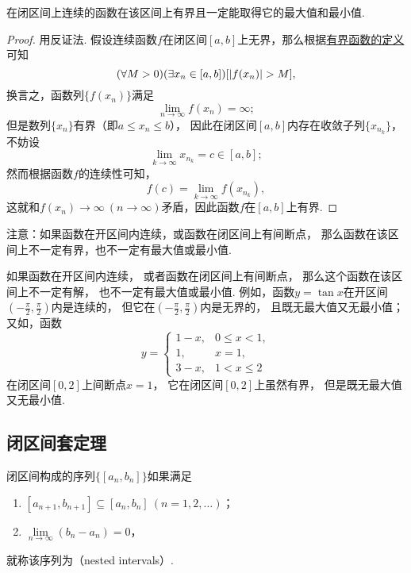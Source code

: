 \begin{theorem}[有界性与最大值最小值定理]\label{theorem:极限.闭区间上连续函数的性质.有界性与最大值最小值定理}
在闭区间上连续的函数在该区间上有界且一定能取得它的最大值和最小值.
\begin{proof}
用反证法.
假设连续函数\(f\)在闭区间\([a,b]\)上无界，那么根据\hyperref[definition:函数.函数的有界性]{有界函数的定义}可知\[
	(\forall M>0)
	(\exists x_n\in[a,b])
	[\abs{f(x_n)} > M],
\]
换言之，函数列\(\{f(x_n)\}\)满足\[
	\lim\limits_{n\to\infty} f(x_n) = \infty;
\]
但是数列\(\{x_n\}\)有界（即\(a \leq x_n \leq b\)），
因此在闭区间\([a,b]\)内存在收敛子列\(\{x_{n_k}\}\)，
不妨设\[
	\lim\limits_{k\to\infty} x_{n_k} = c \in [a,b];
\]
然而根据函数\(f\)的连续性可知，\[
	f(c) = \lim\limits_{k\to\infty} f(x_{n_k}),
\]
这就和\(f(x_n)\to\infty\ (n\to\infty)\)矛盾，因此函数\(f\)在\([a,b]\)上有界.
\end{proof}
\end{theorem}
注意：如果函数在开区间内连续，或函数在闭区间上有间断点，
那么函数在该区间上不一定有界，也不一定有最大值或最小值.

如果函数在开区间内连续，
或者函数在闭区间上有间断点，
那么这个函数在该区间上不一定有解，
也不一定有最大值或最小值.
例如，函数\(y=\tan x\)在开区间\(\left(-\frac{\pi}{2},\frac{\pi}{2}\right)\)内是连续的，
但它在\(\left(-\frac{\pi}{2},\frac{\pi}{2}\right)\)内是无界的，
且既无最大值又无最小值；
又如，函数\[
	y=\left\{ \begin{array}{ll}
		1-x, & 0\leq x<1, \\
		1, & x=1, \\
		3-x, & 1<x\leq2
	\end{array} \right.
\]在闭区间\([0,2]\)上间断点\(x=1\)，
它在闭区间\([0,2]\)上虽然有界，
但是既无最大值又无最小值.

\subsection{闭区间套定理}
\begin{definition}\label{definition:极限.闭区间套的定义}
闭区间构成的序列\(\{[a_n,b_n]\}\)如果满足
\begin{enumerate}
\item \([a_{n+1},b_{n+1}] \subseteq [a_n,b_n]\ (n=1,2,\dotsc)\)；
\item \(\lim\limits_{n\to\infty} (b_n - a_n) = 0\)，
\end{enumerate}
就称该序列为（nested intervals）.
\end{definition}

